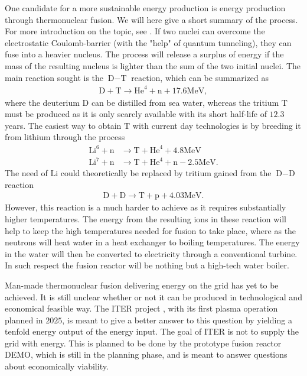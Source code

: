 One candidate for a more sustainable energy production is energy production through thermonuclear fusion.
We will here give a short summary of the process.
For more introduction on the topic, see \cite{Freidberg2008book}.
If two nuclei can overcome the electrostatic Coulomb-barrier (with the "help" of quantum tunneling), they can fuse into a heavier nucleus.
The process will release a surplus of energy if the mass of the resulting nucleus is lighter than the sum of the two initial nuclei.
The main reaction sought is the $\text{D}-\text{T}$ reaction, which can be summarized as
%
\begin{align*}
    \text{D} + \text{T} \to \text{He}^4 + \text{n} + 17.6 \text{MeV},
\end{align*}
%
where the deuterium $\text{D}$ can be distilled from sea water, whereas the tritium $\text{T}$ must be produced as it is only scarcly available with its short half-life of $12.3$ years.
The easiest way to obtain $\text{T}$ with current day technologies is by breeding it from lithium through the process
%
\begin{align*}
    \text{Li}^6 + \text{n} &\to \text{T} + \text{He}^4 + 4.8 \text{MeV}\\
    \text{Li}^7 + \text{n} &\to \text{T} + \text{He}^4 + \text{n} - 2.5 \text{MeV}.
\end{align*}
%
The need of $\text{Li}$ could theoretically be replaced by tritium gained from the $\text{D}-\text{D}$ reaction
%
\begin{align*}
    \text{D} + \text{D} \to \text{T} + \text{p} + 4.03 \text{MeV}.
\end{align*}
%
However, this reaction is a much harder to achieve as it requires substantially higher temperatures.
The energy from the resulting ions in these reaction will help to keep the high temperatures needed for fusion to take place, where as the neutrons will heat water in a heat exchanger to boiling temperatures.
The energy in the water will then be converted to electricity through a conventional turbine.
In such respect the fusion reactor will be nothing but a high-tech water boiler.

Man-made thermonuclear fusion delivering energy on the grid has yet to be achieved.
It is still unclear whether or not it can be produced in technological and economical feasible way.
The ITER project \cite{ITERWeb}, with its first plasma operation planned in $2025$, is meant to give a better answer to this question by yielding a tenfold energy output of the energy input.
The goal of ITER is not to supply the grid with energy.
This is planned to be done by the prototype fusion reactor DEMO, which is still in the planning phase, and is meant to answer questions about economically viability.

